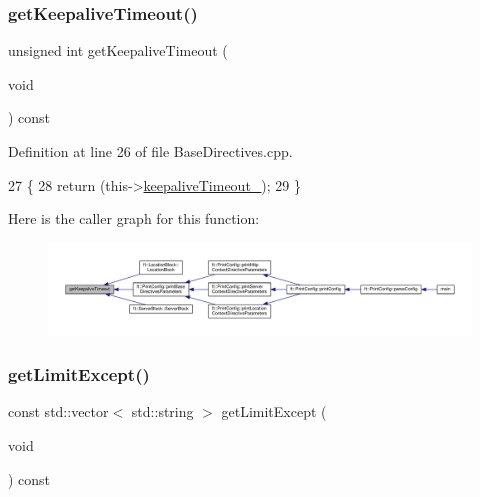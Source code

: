 \subsubsection{\texorpdfstring{get\+Keepalive\+Timeout()}{getKeepaliveTimeout()}}
{\footnotesize\ttfamily unsigned int get\+Keepalive\+Timeout (\begin{DoxyParamCaption}\item[{void}]{ }\end{DoxyParamCaption}) const\hspace{0.3cm}{\ttfamily [inherited]}}



Definition at line 26 of file Base\+Directives.\+cpp.


\begin{DoxyCode}
27     \{
28         \textcolor{keywordflow}{return} (this->\hyperlink{classft_1_1_base_directives_aa1f5f394b428d0d18765a9b9e14e648f}{keepaliveTimeout\_});
29     \}
\end{DoxyCode}
Here is the caller graph for this function\+:
\nopagebreak
\begin{figure}[H]
\begin{center}
\leavevmode
\includegraphics[width=350pt]{classft_1_1_base_directives_ab8574338758f65325cab5d1c394826c8_icgraph}
\end{center}
\end{figure}
\mbox{\label{classft_1_1_location_block_ad2dc75d3f9c9f06f31e3948823557d52}} 
\subsubsection{\texorpdfstring{get\+Limit\+Except()}{getLimitExcept()}}
{\footnotesize\ttfamily const std\+::vector$<$ std\+::string $>$ get\+Limit\+Except (\begin{DoxyParamCaption}\item[{void}]{ }\end{DoxyParamCaption}) const}



